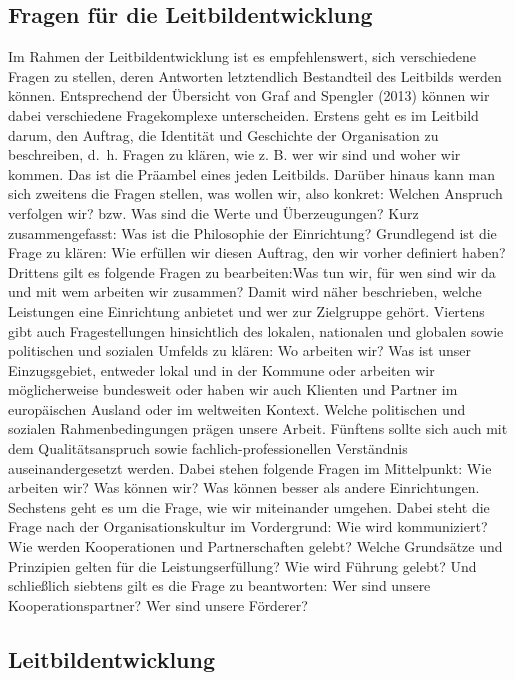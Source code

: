 \documentclass[
  letterpaper,
]{book}
\begin{document}
\subsection{Fragen für die
Leitbildentwicklung}\label{fragen-fuxfcr-die-leitbildentwicklung}

Im Rahmen der Leitbildentwicklung ist es empfehlenswert, sich
verschiedene Fragen zu stellen, deren Antworten letztendlich Bestandteil
des Leitbilds werden können. Entsprechend der Übersicht von Graf and
Spengler (2013) können wir dabei verschiedene Fragekomplexe
unterscheiden. Erstens geht es im Leitbild darum, den Auftrag, die
Identität und Geschichte der Organisation zu beschreiben, d.~h. Fragen
zu klären, wie z. B. wer wir sind und woher wir kommen. Das ist die
Präambel eines jeden Leitbilds. Darüber hinaus kann man sich zweitens
die Fragen stellen, was wollen wir, also konkret: Welchen Anspruch
verfolgen wir? bzw. Was sind die Werte und Überzeugungen? Kurz
zusammengefasst: Was ist die Philosophie der Einrichtung? Grundlegend
ist die Frage zu klären: Wie erfüllen wir diesen Auftrag, den wir vorher
definiert haben? Drittens gilt es folgende Fragen zu bearbeiten:Was tun
wir, für wen sind wir da und mit wem arbeiten wir zusammen? Damit wird
näher beschrieben, welche Leistungen eine Einrichtung anbietet und wer
zur Zielgruppe gehört. Viertens gibt auch Fragestellungen hinsichtlich
des lokalen, nationalen und globalen sowie politischen und sozialen
Umfelds zu klären: Wo arbeiten wir? Was ist unser Einzugsgebiet,
entweder lokal und in der Kommune oder arbeiten wir möglicherweise
bundesweit oder haben wir auch Klienten und Partner im europäischen
Ausland oder im weltweiten Kontext. Welche politischen und sozialen
Rahmenbedingungen prägen unsere Arbeit. Fünftens sollte sich auch mit
dem Qualitätsanspruch sowie fachlich-professionellen Verständnis
auseinandergesetzt werden. Dabei stehen folgende Fragen im Mittelpunkt:
Wie arbeiten wir? Was können wir? Was können besser als andere
Einrichtungen. Sechstens geht es um die Frage, wie wir miteinander
umgehen. Dabei steht die Frage nach der Organisationskultur im
Vordergrund: Wie wird kommuniziert? Wie werden Kooperationen und
Partnerschaften gelebt? Welche Grundsätze und Prinzipien gelten für die
Leistungserfüllung? Wie wird Führung gelebt? Und schließlich siebtens
gilt es die Frage zu beantworten: Wer sind unsere Kooperationspartner?
Wer sind unsere Förderer?

\subsection{Leitbildentwicklung}\label{leitbildentwicklung}
\end{document}
